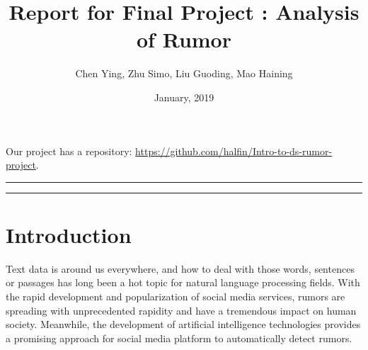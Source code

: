 \documentclass[12pt,a4paper]{article}
\author{Chen Ying, Zhu Simo, Liu Guoding, Mao Haining}
\title{\textbf{Report for Final Project : Analysis of Rumor}}
\date{January, 2019}
\begin{document}
\thispagestyle{plain}
\newcommand{\xiaosi}{\fontsize{12pt}{18pt}\selectfont}
\newcommand{\h}{\begin{tabular}{|c|c|}\hline\end{tabular}}
\newcommand{\rd}{\mathrm{d}}
\newcommand{\dps}[1]{\displaystyle{#1}}
\newcommand{\tabincell}[2]{\begin{tabular}{@{}#1@{}}#2\end{tabular}}
\newcommand{\noindentpar}{\hangafter=1 \setlength{\hangindent}{1.5em}\noindent}
\renewcommand{\refname}{References}


\newcommand{\fn}[1]{\normalfont{#1}}
\newcommand{\fc}[1]{\fontspec{Consolas}\small{#1}\fn{}}
\renewcommand{\'}{\fc{'}\fn{}}
\newcommand{\ns}{\normalsize}
\renewcommand{\contentsname}{Contents}
\maketitle
\vspace{-15pt}
\begin{center}
	Our project has a repository: \url{https://github.com/halfin/Intro-to-ds-rumor-project}.
\end{center}
\vspace{-10pt}
\rule[-10pt]{15cm}{0.05em}
\vspace{-5pt}
\tableofcontents
\vspace{-5pt}
\rule[-10pt]{15cm}{0.05em}
\clearpage
\section{Introduction}
Text data is around us everywhere, and how to deal with those words, sentences or passages has long been a hot topic for natural language processing fields. With the rapid development and popularization of social media services, rumors are spreading with unprecedented rapidity and have a tremendous impact on human society. Meanwhile, the development of artificial intelligence technologies provides a promising approach for social media platform to automatically detect rumors. 
\end{document}
